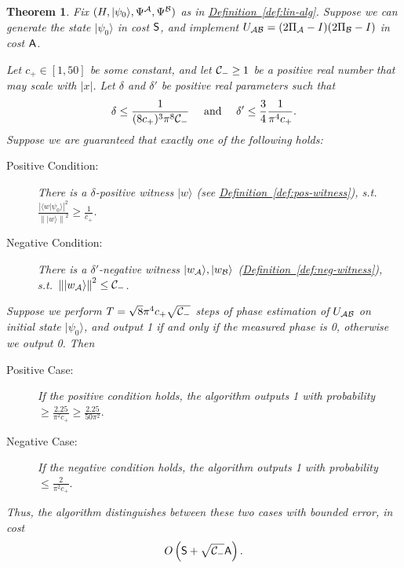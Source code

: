 \documentclass{article}
\newtheorem{theorem}{Theorem}\newtheorem{lemma}[theorem]{Lemma}\newtheorem{proposition}[theorem]{Proposition}\newtheorem{corollary}[theorem]{Corollary}\newtheorem{definition}[theorem]{Definition}\newtheorem{claim}[theorem]{Claim}\newtheorem{remark}[theorem]{Remark}\newenvironment{cfigure}[1][htbp]{\begin{figure}[#1]\centering}{\end{figure}}
\newcommand{\defin}[1]{\hyperref[def:#1]{Definition~\ref*{def:#1}}}
\def\ket#1{{\lvert}#1\rangle}
\renewcommand{\>}{\rangle}
\newcommand{\<}{\langle}
\renewcommand{\(}{\left(}
\renewcommand{\)}{\right)}
\def\braket#1#2{{{\langle}#1\vert}#2\rangle}
\def\norm#1{\left\| #1 \right\|}
\begin{document}
\begin{theorem}\label{thm:lin-alg-fwk}
Fix $(H,\ket{\psi_0},\Psi^{\cal A},\Psi^{\cal B})$ as in \defin{lin-alg}.
Suppose we can generate the state $\ket{\psi_0}$ in cost ${\sf S}$, and implement $U_{\cal AB}=(2\Pi_{\cal A}-I)(2\Pi_{\cal B}-I)$ in cost ${\sf A}$.

\noindent Let $c_+\in [1,50]$ be some constant, and let ${\cal C}_-\geq 1$ be a positive real number that may scale with $|x|$. Let $\delta$ and $\delta'$ be positive real parameters such that 
\begin{equation*}
\delta\leq \frac{1}{(8c_+)^{3}\pi^8{{\cal C}_-}}\quad\mbox{ and }\quad\delta'\leq \frac{3}{4}\frac{1}{\pi^4c_+}.
\end{equation*}
Suppose we are guaranteed that exactly one of the following holds:
\begin{description}
\item[Positive Condition:] There is a $\delta$-positive witness $\ket{w}$ (see \defin{pos-witness}), s.t.~$\frac{|\braket{w}{\psi_0}|^2}{\norm{\ket{w}}^2}\geq \frac{1}{c_+}$. 
\item[Negative Condition:] There is a $\delta'$-negative witness $\ket{w_{\cal A}},\ket{w_{\cal B}}$ (\defin{neg-witness}), s.t.~$\norm{\ket{w_{\cal A}}}^2 \leq {\cal C}_-$.
\end{description}
Suppose we perform $T= \sqrt{8}\pi^4 c_+\sqrt{{\cal C}_-}$ steps of phase estimation of $U_{\cal AB}$ on initial state $\ket{\psi_0}$, and output 1 if and only if the measured phase is 0, otherwise we output 0. Then
\begin{description}
\item[Positive Case:] If the positive condition holds, the algorithm outputs 1 with probability 
$
\geq\frac{2.25}{\pi^2c_+}\geq \frac{2.25}{50\pi^2}.
$ 
\item[Negative Case:] If the negative condition holds, the algorithm outputs 1 with probability 
$
\leq\frac{2}{\pi^2c_+}.
$ 
\end{description}
Thus, the algorithm distinguishes between these two cases with bounded error, in cost
$$O\left({\sf S}+\sqrt{{\cal C}_-}{\sf A}\right).$$
\end{theorem}
\end{document}
